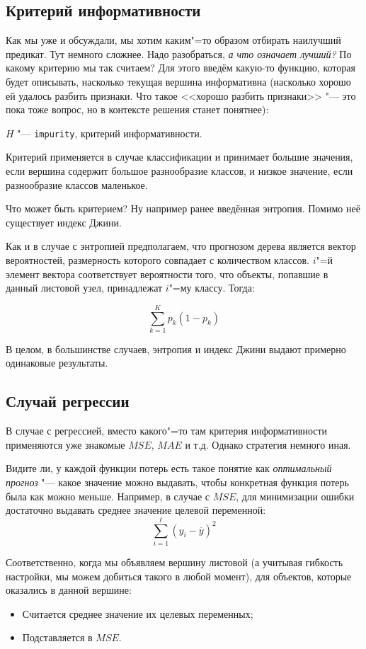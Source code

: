 \subsection*{Критерий информативности}
Как мы уже и обсуждали, мы хотим каким"=то образом отбирать наилучший предикат. Тут немного сложнее. Надо разобраться, \textit{а что означает лучший?} По какому критерию мы так считаем? Для этого введём какую-то функцию, которая будет описывать, насколько текущая вершина информативна (насколько хорошо ей удалось разбить признаки. Что такое <<хорошо разбить признаки>> "--- это пока тоже вопрос, но в контексте решения станет понятнее):

$H$ "--- \texttt{impurity}, критерий информативности.

Критерий применяется в случае классификации и принимает большие значения, если вершина содержит большое разнообразие классов, и низкое значение, если разнообразие классов маленькое.

Что может быть критерием? Ну например ранее введённая энтропия. Помимо неё существует индекс Джини.

Как и в случае с энтропией предполагаем, что прогнозом дерева является вектор вероятностей, размерность которого совпадает с количеством классов. $i$"=й элемент вектора соответствует вероятности того, что объекты, попавшие в данный листовой узел, принадлежат $i$"=му классу. Тогда:

\[
\sum_{k=1}^K p_k (1 - p_k)
\]

В целом, в большинстве случаев, энтропия и индекс Джини выдают примерно одинаковые результаты.

\subsection*{Случай регрессии}
В случае с регрессией, вместо какого"=то там критерия информативности применяются уже знакомые $MSE$, $MAE$ и т.д. Однако стратегия немного иная.

Видите ли, у каждой функции потерь есть такое понятие как \textit{оптимальный прогноз} "--- какое значение можно выдавать, чтобы конкретная функция потерь была как можно меньше. Например, в случае с $MSE$, для минимизации ошибки достаточно выдавать среднее значение целевой переменной:
\[
\sum_{i=1}^\ell (y_i - \overline{y})^2
\]

Соответственно, когда мы объявляем вершину листовой (а учитывая гибкость настройки, мы можем добиться такого в любой момент), для объектов, которые оказались в данной вершине:
\begin{itemize}
    \item Считается среднее значение их целевых переменных;
    \item Подставляется в $MSE$.
\end{itemize}

